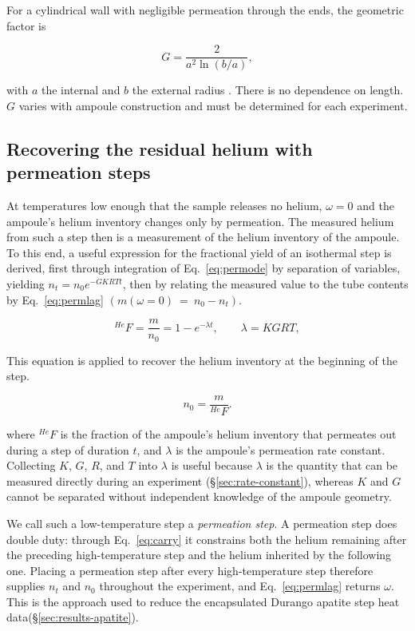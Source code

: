 For a cylindrical wall with negligible permeation through the ends, the geometric factor is 

\begin{equation}
\label{eq:geomfactor}
G = \frac{2}{a^{2}\ln(b/a)} ,
\end{equation}

with $a$ the internal and $b$ the external radius \citep{masaryk1968}. There is no dependence on length. $G$ varies with ampoule construction and must be determined for each experiment.

\subsection{Recovering the residual helium with permeation steps}\label{sec:permeation-steps}

At temperatures low enough that the sample releases no helium, $\omega = 0$ and the ampoule's helium inventory changes only by permeation. The measured helium from such a step then is a measurement of the helium inventory of the ampoule. To this end, a useful expression for the fractional yield of an isothermal step is derived, first through integration of Eq.~\eqref{eq:permode} by separation of variables, yielding $n_t = n_0e^{-GKRTt}$, then by relating the measured value to the tube contents by Eq.~\eqref{eq:permlag} $\left(m(\omega=0)~=~n_0-n_t\right)$.

\begin{equation}
\label{eq:permsol}
^{He}F = \frac{m}{n_{0}} = 1 - e^{-\lambda t} , \qquad \lambda = KGRT ,
\end{equation}

This equation is applied to recover the helium inventory at the beginning of the step.

\begin{equation}
\label{eq:n0perm}
n_{0} = \frac{m}{^{He}F} .
\end{equation}

where $^{He}F$ is the fraction of the ampoule's helium inventory that permeates out during a step of duration $t$, and $\lambda$ is the ampoule's permeation rate constant. Collecting $K$, $G$, $R$, and $T$ into $\lambda$ is useful because $\lambda$ is the quantity that can be measured directly during an experiment (\S\ref{sec:rate-constant}), whereas $K$ and $G$ cannot be separated without independent knowledge of the ampoule geometry.
 
We call such a low-temperature step a \emph{permeation step}. A permeation step does double duty: through Eq.~\eqref{eq:carry} it constrains both the helium remaining after the preceding high-temperature step and the helium inherited by the following one. Placing a permeation step after every high-temperature step therefore supplies $n_{t}$ and $n_{0}$ throughout the experiment, and Eq.~\eqref{eq:permlag} returns $\omega$. This is the approach used to reduce the encapsulated Durango apatite step heat data(\S\ref{sec:results-apatite}).

